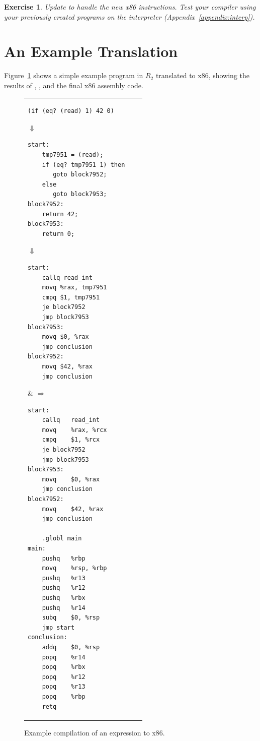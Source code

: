 \documentclass[11pt]{book}
\newtheorem{exercise}[theorem]{Exercise}
\begin{document}
\begin{exercise}\normalfont
Update  to handle the new x86 instructions.
Test your compiler using your previously created programs on the
 interpreter (Appendix~\ref{appendix:interp}).
\end{exercise}


\section{An Example Translation}

Figure~\ref{fig:if-example-x86} shows a simple example program in
$R_2$ translated to x86, showing the results of
, , and the final
x86 assembly code.

\begin{figure}[tbp]
\begin{tabular}{lll}
\begin{minipage}{0.5\textwidth}
\begin{lstlisting}
(if (eq? (read) 1) 42 0)
\end{lstlisting}
$\Downarrow$
\begin{lstlisting}
start:
    tmp7951 = (read);
    if (eq? tmp7951 1) then
       goto block7952;
    else
       goto block7953;
block7952:
    return 42;
block7953:
    return 0;
\end{lstlisting}
$\Downarrow$
\begin{lstlisting}
start:
    callq read_int
    movq %rax, tmp7951
    cmpq $1, tmp7951
    je block7952
    jmp block7953
block7953:
    movq $0, %rax
    jmp conclusion
block7952:
    movq $42, %rax
    jmp conclusion
\end{lstlisting}
\end{minipage}
&
$\Rightarrow\qquad$
\begin{minipage}{0.4\textwidth}
\begin{lstlisting}
start:
	callq	read_int
	movq	%rax, %rcx
	cmpq	$1, %rcx
	je block7952
	jmp block7953
block7953:
	movq	$0, %rax
	jmp conclusion
block7952:
	movq	$42, %rax
	jmp conclusion

	.globl main
main:
	pushq	%rbp
	movq	%rsp, %rbp
	pushq	%r13
	pushq	%r12
	pushq	%rbx
	pushq	%r14
	subq	$0, %rsp
	jmp start
conclusion:
	addq	$0, %rsp
	popq	%r14
	popq	%rbx
	popq	%r12
	popq	%r13
	popq	%rbp
	retq
\end{lstlisting}
\end{minipage}
\end{tabular}
\caption{Example compilation of an  expression to x86.}
\label{fig:if-example-x86}
\end{figure}
\end{document}
